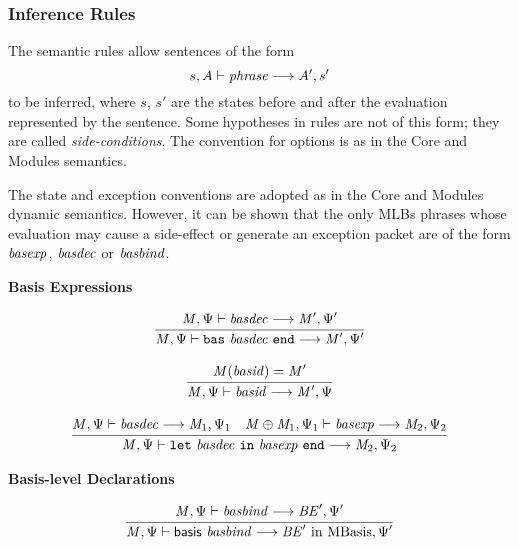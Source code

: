 \subsubsection{Inference Rules}

The semantic rules allow sentences of the form
\begin{displaymath}
s, A \vdash \mit{phrase} \longrightarrow A', s'
\end{displaymath}
to be inferred, where $s$, $s'$ are the states before and after the
evaluation represented by the sentence.  Some hypotheses in rules are
not of this form; they are called \emph{side-conditions}. The
convention for options is as in the Core and Modules semantics.

The state and exception conventions are adopted as in the Core and
Modules dynamic semantics.  However, it can be shown that the only
MLBs phrases whose evaluation may cause a side-effect or generate an
exception packet are of the form $\mit{basexp}$, $\mit{basdec}$ or
$\mit{basbind}$.

\vspace{2\parsep}

{\large\noindent
\textbf{Basis Expressions} \hfill 
{}
}

\begin{equation}
\judge{
\mit{M}, \Psi \vdash \mit{basdec} \longrightarrow \mit{M}', \Psi'
}{
\mit{M}, \Psi \vdash \mtt{bas}~ \mit{basdec} ~\mtt{end} \longrightarrow \mit{M}', \Psi'
}
\end{equation}

\begin{equation}
\judge{
\mit{M}(\mit{basid}) = \mit{M}'
}{
\mit{M}, \Psi \vdash \mit{basid} \longrightarrow \mit{M}', \Psi
}
\end{equation}

\begin{equation}
\judge{
\mit{M}, \Psi \vdash \mit{basdec} \longrightarrow \mit{M}_1, \Psi_1 \quad
\mit{M} \oplus \mit{M}_1, \Psi_1 \vdash \mit{basexp} \longrightarrow \mit{M}_2, \Psi_2
}{
\mit{M}, \Psi \vdash \mtt{let}~ \mit{basdec} ~\mtt{in}~ \mit{basexp} ~\mtt{end} \longrightarrow \mit{M}_2, \Psi_2
}
\end{equation}

{\large\noindent
\textbf{Basis-level Declarations} \hfill 
{}
}

\begin{equation}
\judge{
\mit{M}, \Psi  \vdash \mit{basbind} \longrightarrow \mit{BE}', \Psi'
}{
\mit{M}, \Psi  \vdash \msf{basis}~ \mit{basbind} \longrightarrow \mit{BE}' ~\mrm{in}~ \mrm{MBasis}, \Psi'
}
\end{equation}

